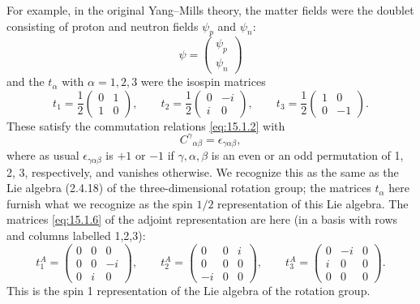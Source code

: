 For example, in the original Yang--Mills theory, the matter fields were the
doublet consisting of proton and neutron fields $\psi_p$ and $\psi_n$:
\[
 \psi=\begin{pmatrix}\psi_p\\ \psi_n\end{pmatrix}
\]
and the $t_\alpha$ with $\alpha=1,2,3$ were the isospin matrices
\[
 t_1=\frac12\begin{pmatrix}0&1\\1&0\end{pmatrix},\qquad
 t_2=\frac12\begin{pmatrix}0&-i\\i&0\end{pmatrix},\qquad
 t_3=\frac12\begin{pmatrix}1&0\\0&-1\end{pmatrix} .
\]
These satisfy the commutation relations \eqref{eq:15.1.2} with
\[
 C^\gamma{}_{\alpha\beta}=\epsilon_{\gamma\alpha\beta} ,
\]
where as usual $\epsilon_{\gamma\alpha\beta}$ is $+1$ or $-1$ if
$\gamma,\alpha,\beta$ is an even or an odd permutation of 1, 2, 3,
respectively, and vanishes otherwise. We recognize this as the same as the Lie
algebra (2.4.18) of the three-dimensional rotation group; the matrices
$t_\alpha$ here furnish what we recognize as the spin $1/2$ representation of
this Lie algebra. The matrices \eqref{eq:15.1.6} of the adjoint representation
are here (in a basis with rows and columns labelled 1,2,3):
\[
 t^A_1=\begin{pmatrix}0&0&0\\0&0&-i\\0&i&0\end{pmatrix},\qquad
 t^A_2=\begin{pmatrix}0&0&i\\0&0&0\\-i&0&0\end{pmatrix},\qquad
 t^A_3=\begin{pmatrix}0&-i&0\\i&0&0\\0&0&0\end{pmatrix} .
\]
This is the spin 1 representation of the Lie algebra of the rotation group.

